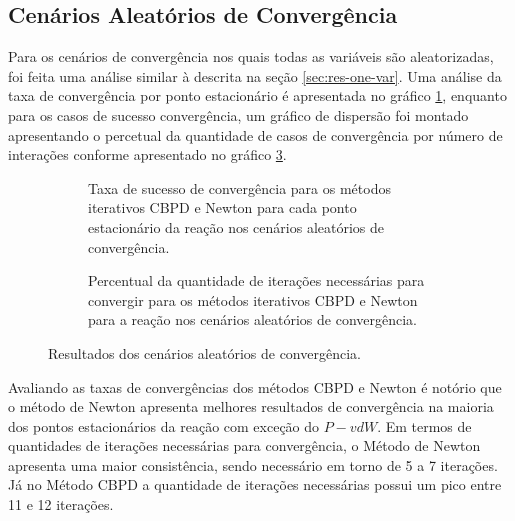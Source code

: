 \subsection{Cenários Aleatórios de Convergência}

Para os cenários de convergência nos quais todas as variáveis são aleatorizadas, foi feita uma análise similar à descrita na seção \ref{sec:res-one-var}. Uma análise da taxa de convergência por ponto estacionário é apresentada no gráfico \ref{fig:result-mult-var-conv-tax}, enquanto para os casos de sucesso convergência, um gráfico de dispersão foi montado apresentando o percetual da quantidade de casos de convergência por número de interações conforme apresentado no gráfico \ref{fig:result-mult-var-conv-metric}.

\begin{figure}[h]
  \begin{subfigure}{.5\textwidth}
    \begin{center}
    
    \end{center}
    \caption{Taxa de sucesso de convergência para os métodos iterativos CBPD e Newton para cada ponto estacionário da reação  nos cenários aleatórios de convergência.}
    \label{fig:result-mult-var-conv-tax}
  \end{subfigure}\hspace{5mm}%
  \begin{subfigure}{.5\textwidth}
    \begin{center}
    
    \end{center}
    \caption{Percentual da quantidade de iterações necessárias para convergir para os métodos iterativos CBPD e Newton para a reação  nos cenários aleatórios de convergência.}
    \label{fig:result-mult-var-conv-metric}
  \end{subfigure}
  \caption{Resultados dos cenários aleatórios de convergência.}
\end{figure}

Avaliando as taxas de convergências dos métodos CBPD e Newton é notório que o método de Newton apresenta melhores resultados de convergência na maioria dos pontos estacionários da reação com exceção do $P-vdW$. Em termos de quantidades de iterações necessárias para convergência, o Método de Newton apresenta uma maior consistência, sendo necessário em torno de 5 a 7 iterações. Já no Método CBPD a quantidade de iterações necessárias possui um pico entre 11 e 12 iterações.
